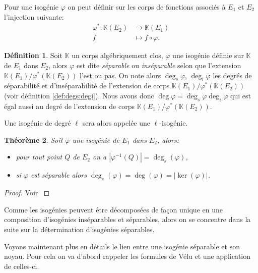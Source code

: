 \documentclass[10pt,a4paper]{book}
\theoremstyle{plain}
\newtheorem{thm}{Théorème}[chapter]
\theoremstyle{definition}
\theoremstyle{definition}
\theoremstyle{definition}
\theoremstyle{definition}
\theoremstyle{definition}
\newtheorem{defi}[thm]{Définition}
\theoremstyle{remark}
\theoremstyle{remark}
\theoremstyle{definition}
\begin{document}
Pour une isogénie $\varphi$ on peut définir sur les corps de fonctions 
associés à $E_1$ et $E_2$ l'injection suivante:
\begin{equation*}
\begin{alignedat}{1}
\varphi^*: \mathbb{K}(E_2) & \rightarrow \mathbb{K}(E_1) \\
f & \mapsto f  \circ \varphi.
\end{alignedat}
\end{equation*}

\begin{defi}
Soit $\mathbb{K}$ un corps algébriquement clos, $\varphi$ une isogénie définie
sur $\mathbb{K}$ de $E_1$ dans $E_2$, alors $\varphi$ est dite 
\emph{séparable} ou \emph{inséparable} selon que l'extension 
$\mathbb{K}(E_1)/\varphi^*(\mathbb{K}(E_2))$ l'est ou pas. On note alors 
\emph{$\deg_s{\varphi}$}, \emph{$\deg_i{\varphi}$} les degrés de séparabilité 
et d'inséparabilité de l'extension de corps 
$\mathbb{K}(E_1)/\varphi^*(\mathbb{K}(E_2))$ (voir définition 
\ref{def:degs:degi}). Nous avons donc $\deg{\varphi}=
\deg_s{\varphi}\deg_i{\varphi}$ qui est égal aussi au degré de l'extension de 
corps $\mathbb{K}(E_1)/\varphi^*(\mathbb{K}(E_2))$.
\end{defi}

Une isogénie de degré $\ell$ sera alors appelée une $\ell$-isogénie.

\begin{thm}
Soit $\varphi$ une isogénie de $E_1$ dans $E_2$, alors:
\begin{itemize}
\item pour tout point $Q$ de $E_2$ on a $|\varphi^{-1}(Q)|=\deg_s(\varphi)$,
\item si $\varphi$ est séparable alors $\deg_s(\varphi)=\deg(\varphi)=|\ker(\varphi)|$.
\end{itemize}
\end{thm}

\begin{proof}
Voir \cite[III.4.10]{Silv1}
\end{proof}

Comme les isogénies peuvent être décomposées de façon unique en une composition 
d'isogénies inséparables et séparables, alors on se concentre dans la suite sur la
détermination d'isogénies séparables.

Voyons maintenant plus en détails le lien entre une isogénie séparable et son 
noyau. Pour cela on va d'abord rappeler les formules de Vélu et une application
de celles-ci.
\end{document}
